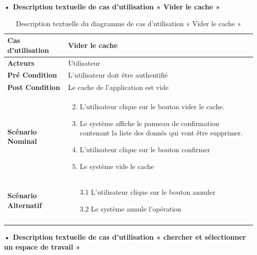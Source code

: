 \textbf{•	Description textuelle de cas d'utilisation « Vider le cache »}

\begin{longtable}{|p{5cm}|p{10cm}|}
\hline
\textbf{Cas d'utilisation}&Vider le cache  \\
\hline
\textbf{Acteurs}&Utilisateur\\
\hline
\textbf{Pré Condition}&L'utilisateur doit être authentifié\\
\hline
\textbf{Post Condition}&Le cache de l'application est vide \\
\hline
\textbf{Scénario Nominal}&
\vspace{-\baselineskip}
\begin{enumerate}
  \setcounter{enumi}{1}
  \item L'utilisateur clique sur le bouton vider le cache.
  \item Le système affiche le panneau de confirmation contenant la liste des donnés qui vont être supprimer.
  \item L'utilisateur clique sur le bouton confirmer
  \item Le système vide le cache
\end{enumerate}\\
\hline
\textbf{Scénario Alternatif}&
\vspace{-\baselineskip}
\begin{enumerate}
 \item [3.1] L'utilisateur clique sur le bouton annuler
 \item [3.2] Le système annule l'opération
\end{enumerate}\\
\hline
\caption{Description textuelle du diagramme de cas d'utilisation « Vider le cache  »}
\label{tab:use_case_empty_cache}
\end{longtable}


\textbf{•	Description textuelle de cas d'utilisation « chercher et sélectionner un espace de travail  »}

